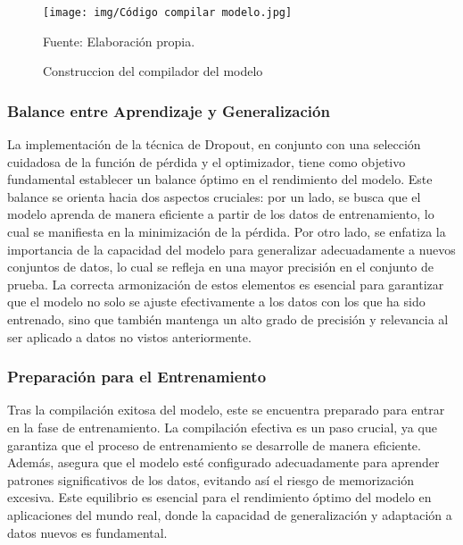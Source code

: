 \begin{figure}[H]
    \begin{minipage}[t]{0.9\textwidth}
        \caption{Construccion del compilador del modelo}
        \label{compilar_modelo}        
    \end{minipage}

    \vspace{10pt}

    \begin{minipage}[b]{1\textwidth}
        \centering
        \texttt{[image: img/Código compilar modelo.jpg]}        
    \end{minipage}

    \begin{minipage}[t]{0.9\textwidth}
        Fuente: Elaboración propia.
    \end{minipage}
\end{figure}

\subsubsection{Balance entre Aprendizaje y Generalización} 
La implementación de la técnica de Dropout, en conjunto con una selección cuidadosa de la función de pérdida y el optimizador, tiene como objetivo fundamental establecer un balance óptimo en el rendimiento del modelo. Este balance se orienta hacia dos aspectos cruciales: por un lado, se busca que el modelo aprenda de manera eficiente a partir de los datos de entrenamiento, lo cual se manifiesta en la minimización de la pérdida. Por otro lado, se enfatiza la importancia de la capacidad del modelo para generalizar adecuadamente a nuevos conjuntos de datos, lo cual se refleja en una mayor precisión en el conjunto de prueba. La correcta armonización de estos elementos es esencial para garantizar que el modelo no solo se ajuste efectivamente a los datos con los que ha sido entrenado, sino que también mantenga un alto grado de precisión y relevancia al ser aplicado a datos no vistos anteriormente.

\subsubsection{Preparación para el Entrenamiento} 
Tras la compilación exitosa del modelo, este se encuentra preparado para entrar en la fase de entrenamiento. La compilación efectiva es un paso crucial, ya que garantiza que el proceso de entrenamiento se desarrolle de manera eficiente. Además, asegura que el modelo esté configurado adecuadamente para aprender patrones significativos de los datos, evitando así el riesgo de memorización excesiva. Este equilibrio es esencial para el rendimiento óptimo del modelo en aplicaciones del mundo real, donde la capacidad de generalización y adaptación a datos nuevos es fundamental.

